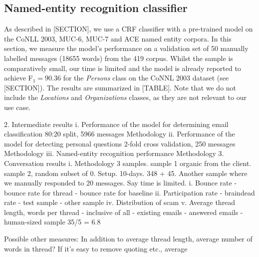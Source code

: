 \subsection{Named-entity recognition classifier}
As described in [SECTION], we use a CRF classifier with a pre-trained model on the CoNLL 2003, MUC-6, MUC-7 and ACE named entity corpora. In this section, we measure the model's performance on a validation set of 50 manually labelled messages (18655 words) from the 419 corpus. Whilst the sample is comparatively small, our time is limited and the model is already reported to achieve F$_{1} = 90.36$ for the \emph{Persons} class on the CoNNL 2003 dataset (see [SECTION]). The results are summarized in [TABLE]. Note that we do not include the \emph{Locations} and \emph{Organizations} classes, as they are not relevant to our use case.
\begin{center}
\end{center}


	2. Intermediate results
		i. Performance of the model for determining email classification
			80:20 split, 5966 messages
			Methodology
		ii. Performance of the model for detecting personal questions
			2-fold cross validation, 250 messages
			Methodology
		iii. Named-entity recognition performance
			Methodology
	3. Conversation results
		i. Methodology 3 samples. sample 1 organic from the client. sample 2, random subset of 
		0. Setup. 10-days. 348 + 45. Another sample where we manually responded to 20 messages. Say time is limited.
		i. Bounce rate
			- bounce rate for thread
			- bounce rate for baseline
		ii. Participation rate
			- braindead rate
			- test sample
			- other sample
		iv. Distribution of scam
		v.  Average thread length, words per thread
			- inclusive of all
			- existing emails
			- answered emails
			- human-sized sample 35/5 = 6.8


Possible other measures: In addition to average thread length, average number of words in thread? If it's easy to remove quoting etc., average %






